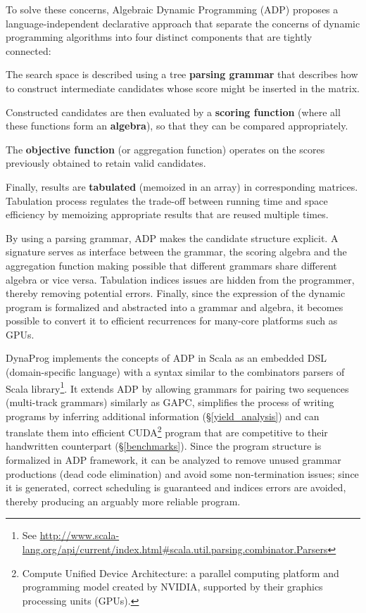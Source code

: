 To solve these concerns, Algebraic Dynamic Programming (ADP) \cite{adp} proposes a language-independent declarative approach that separate the concerns of dynamic programming algorithms into four distinct components that are tightly connected:\ol
\item The search space is described using a tree \textbf{parsing grammar} that describes how to construct intermediate candidates whose score might be inserted in the matrix.
\item Constructed candidates are then evaluated by a \textbf{scoring function} (where all these functions form an \textbf{algebra}), so that they can be compared appropriately.
\item The \textbf{objective function} (or aggregation function) operates on the scores previously obtained to retain valid candidates.
\item Finally, results are \textbf{tabulated} (memoized in an array) in corresponding matrices. Tabulation process regulates the trade-off between running time and space efficiency by memoizing appropriate results that are reused multiple times.
\ole

By using a parsing grammar, ADP makes the candidate structure explicit. A signature serves as interface between the grammar, the scoring algebra and the aggregation function making possible that different grammars share different algebra or vice versa. Tabulation indices issues are hidden from the programmer, thereby removing potential errors. Finally, since the expression of the dynamic program is formalized and abstracted into a grammar and algebra, it becomes possible to convert it to efficient recurrences for many-core platforms such as GPUs. \cite{adp_gpu}

DynaProg implements the concepts of ADP in Scala as an embedded DSL (domain-specific language) with a syntax similar to the combinators parsers of Scala library\footnote{See \url{http://www.scala-lang.org/api/current/index.html\#scala.util.parsing.combinator.Parsers}}. It extends ADP by allowing grammars for pairing two sequences (multi-track grammars) similarly as GAPC\cite{gapc_thesis}, simplifies the process of writing programs by inferring additional information (\S\ref{yield_analysis}) and can translate them into efficient CUDA\footnote{Compute Unified Device Architecture: a parallel computing platform and programming model created by NVIDIA, supported by their graphics processing units (GPUs).} program that are competitive to their handwritten counterpart (\S\ref{benchmarks}). Since the program structure is formalized in ADP framework, it can be analyzed to remove unused grammar productions (dead code elimination) and avoid some non-termination issues; since it is generated, correct scheduling is guaranteed and indices errors are avoided, thereby producing an arguably more reliable program.

